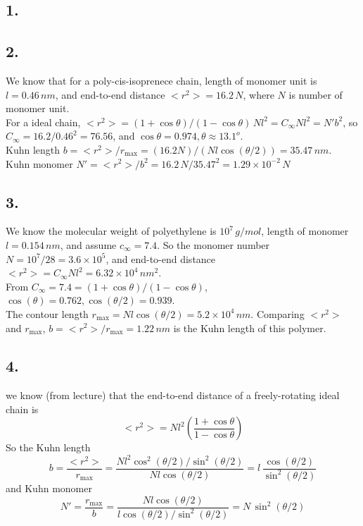 \documentclass[a4paper]{article}
\begin{document}
\subsection*{1.}
\vspace{5cm} 

\subsection*{2.}
We know that for a poly-cis-isoprenece chain, length of monomer unit is $l=0.46\,nm$, 
and end-to-end distance $<r^2> = 16.2\,N$, where $N$ is number of monomer unit. \\
For a ideal chain, $<r^2> = (1+\cos\theta )/ (1-\cos \theta) \, N l^2 =  C_\infty N l^2 = N' b^2$, 
so $C_\infty = 16.2/0.46^2 = 76.56$, and $\cos \theta = 0.974, \theta \approx 13.1^o$.\\
Kuhn length $b = <r^2> / r_{\max} = (16.2N) / (N l \cos (\theta/2)) = 35.47\,nm$.  \\
Kuhn monomer $N' = <r^2> / b^2 = 16.2\,N / 35.47^2 = 1.29 \times 10^{-2}\,N$

\subsection*{3.}
We know the molecular weight of polyethylene is $10^7\, g/mol$, length of monomer $l =0.154\,nm$, and assume $c_\infty = 7.4$.
So the monomer number $N = 10^7/28 = 3.6 \times 10^5$, and end-to-end distance $<r^2> = C_\infty N l^2 = 6.32 \times 10^4\,nm^2$.  \\
From $C_\infty = 7.4 = (1+\cos \theta) / (1-\cos\theta)$, $\cos(\theta) = 0.762, \cos(\theta/2) =0.939$.  \\
The contour length $r_{\max} = N l \cos(\theta /2) = 5.2 \times 10^4\,nm$.
Comparing $<r^2>$ and $r_{\max}$, $b = <r^2> / r_{\max} = 1.22\,nm$ is the Kuhn length of this polymer.

\subsection*{4.}
we know (from lecture) that the end-to-end distance of a freely-rotating ideal chain is 
\[
    <r^2> = N l^2 \left( \frac{1+\cos \theta}{1-\cos \theta} \right) 
\]
So the Kuhn length 
\[
    b = \frac{<r^2>}{r_{\max}} = \frac{N l^2 \cos^2 (\theta /2) / \sin^2 (\theta /2)}{Nl\cos(\theta/2)}
      = l\, \frac{\cos (\theta /2)}{\sin^2 (\theta /2)}
\]
and 
Kuhn monomer 
\[
    N' = \frac{r_{\max}}{b} = \frac{N l \cos (\theta /2)}{l \cos (\theta /2) / \sin^2(\theta /2)}
       = N\, \sin^2(\theta /2)
\]
%
\end{document}

